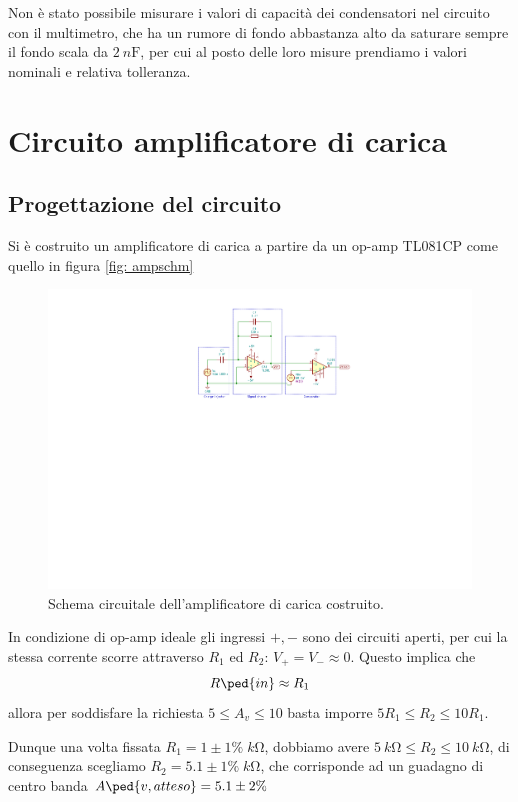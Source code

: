 \documentclass[10pt,a4paper]{article}
\begin{document}
Non è stato possibile misurare i valori di capacità dei condensatori nel
circuito con il multimetro, che ha un rumore di fondo abbastanza alto da
saturare sempre il fondo scala da $\SI{2}{n\F}$, per cui al posto delle loro
misure prendiamo i valori nominali e relativa tolleranza.

\section{Circuito amplificatore di carica}
\subsection{Progettazione del circuito}
Si è costruito un amplificatore di carica a partire da un op-amp TL081CP come
quello in figura \ref{fig: ampschm}

\begin{figure}[htbp]
    \centering
	\includegraphics[scale=1.2]{Qamp}
    \caption{Schema circuitale dell'amplificatore di carica costruito.
    \label{fig: Qampschm}}
\end{figure}

In condizione di op-amp ideale gli ingressi $+, -$ sono dei circuiti aperti,
per cui la stessa corrente scorre attraverso $R_1$ ed $R_2$:
$V_+ = V_- \approx 0$.
Questo implica che
\begin{equation}\label{eq: Zin}
R\ped{in} \approx R_1
\end{equation}
allora per soddisfare la richiesta $5 \leq A_v \leq 10$ basta imporre
$5 R_1 \leq R_2 \leq 10 R_1$.

Dunque una volta fissata $R_1 = 1 \pm 1\% \; \si{k\ohm}$, dobbiamo avere
$\SI{5}{k\ohm} \leq R_2 \leq \SI{10}{k\ohm}$, di conseguenza scegliamo
$R_2 = 5.1 \pm 1\% \; \si{k\ohm}$, che corrisponde ad un guadagno
di centro banda $A\ped{v, atteso} = 5.1 \pm 2\%$ 
\end{document}
